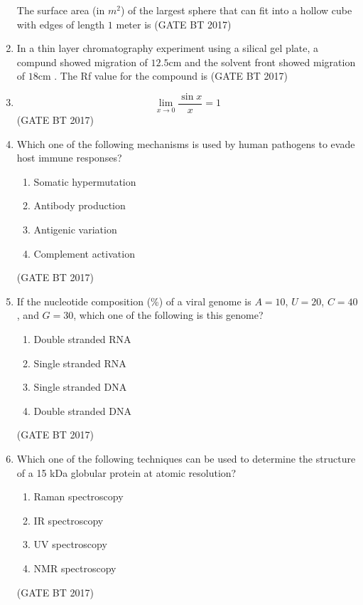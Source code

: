 \documentclass[journal,12pt,onecolumn]{IEEEtran}
\theoremstyle{remark}
\begin{document}
\begin{enumerate}
The surface area (in $m^2$) of the largest sphere that can fit into a hollow cube with edges of length $1$ meter is 
\hfill (GATE BT 2017)

\item 

In a thin layer chromatography experiment using a silical gel plate, a compund showed migration of $12.5$cm and the solvent front showed migration of $18$cm . The Rf value for the compound is 
\hfill (GATE BT 2017)

\item 

\[
\lim_{x\to 0}\frac{\sin x}{x}=1
\]
\hfill (GATE BT 2017)

\item Which one of the following mechanisms is used by human pathogens to evade host immune responses?
\begin{enumerate}
    \item Somatic hypermutation
    \item Antibody production
    \item Antigenic variation
    \item Complement activation
\end{enumerate}
\hfill(GATE BT 2017)

\item If the nucleotide composition (\%) of a viral genome is $A=10$, $U=20$, $C=40$, and $G=30$, which one of the following is this genome?
\begin{enumerate}
    \item Double stranded RNA
    \item Single stranded RNA
    \item Single stranded DNA
    \item Double stranded DNA
\end{enumerate}
\hfill (GATE BT 2017)

\item Which one of the following techniques can be used to determine the structure of a 15 kDa globular protein at atomic resolution?
\begin{enumerate}
    \item Raman spectroscopy
    \item IR spectroscopy
    \item UV spectroscopy
    \item NMR spectroscopy
\end{enumerate}
\hfill (GATE BT 2017)


\end{enumerate}
\end{document}
